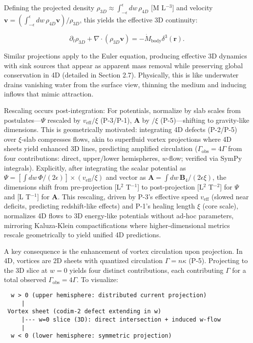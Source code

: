 Defining the projected density $\rho_{3D} \approx \int_{-\epsilon}^{\epsilon} dw \, \rho_{4D}$ [M L$^{-3}$] and velocity $\mathbf{v} = \left( \int_{-\epsilon}^{\epsilon} dw \, \rho_{4D} \mathbf{v} \right) / \rho_{3D}$, this yields the effective 3D continuity:

\[
\partial_t \rho_{3D} + \nabla \cdot (\rho_{3D} \mathbf{v}) = -\dot{M}_{\text{body}} \delta^3(\mathbf{r}).
\]

Similar projections apply to the Euler equation, producing effective 3D dynamics with sink sources that appear as apparent mass removal while preserving global conservation in 4D (detailed in Section 2.7). Physically, this is like underwater drains vanishing water from the surface view, thinning the medium and inducing inflows that mimic attraction.

Rescaling occurs post-integration: For potentials, normalize by slab scales from postulates---$\Psi$ rescaled by $v_{\text{eff}} / \xi$ (P-3/P-1), $\mathbf{A}$ by $/ \xi$ (P-5)---shifting to gravity-like dimensions. This is geometrically motivated: integrating 4D defects (P-2/P-5) over $\xi$-slab compresses flows, akin to superfluid vortex projections where 4D sheets yield enhanced 3D lines, predicting amplified circulation ($\Gamma_{\text{obs}} = 4\Gamma$ from four contributions: direct, upper/lower hemispheres, $w$-flow; verified via SymPy integrals). Explicitly, after integrating the scalar potential as $\Psi = \left[ \int dw \, \Phi / (2\epsilon) \right] \times (v_{\text{eff}} / \xi)$ and vector as $\mathbf{A} = \int dw \, \mathbf{B}_4 / (2\epsilon \xi)$, the dimensions shift from pre-projection [L$^2$ T$^{-1}$] to post-projection [L$^2$ T$^{-2}$] for $\Psi$ and [L T$^{-1}$] for $\mathbf{A}$. This rescaling, driven by P-3's effective speed $v_{\text{eff}}$ (slowed near deficits, predicting redshift-like effects) and P-1's healing length $\xi$ (core scale), normalizes 4D flows to 3D energy-like potentials without ad-hoc parameters, mirroring Kaluza-Klein compactifications where higher-dimensional metrics rescale geometrically to yield unified 4D predictions.

A key consequence is the enhancement of vortex circulation upon projection. In 4D, vortices are 2D sheets with quantized circulation $\Gamma = n \kappa$ (P-5). Projecting to the 3D slice at $w=0$ yields four distinct contributions, each contributing $\Gamma$ for a total observed $\Gamma_{\text{obs}} = 4\Gamma$. To visualize:

\begin{verbatim}
  w > 0 (upper hemisphere: distributed current projection)
     |
 Vortex sheet (codim-2 defect extending in w)
     |--- w=0 slice (3D): direct intersection + induced w-flow
     |
  w < 0 (lower hemisphere: symmetric projection)
\end{verbatim}

